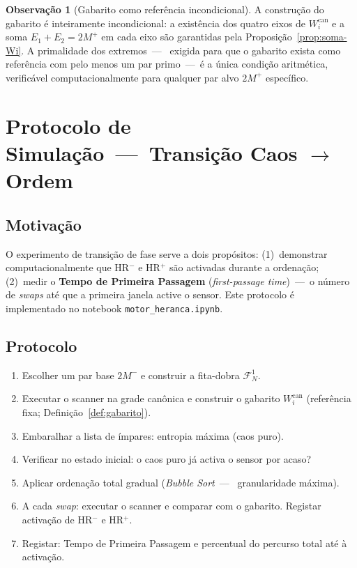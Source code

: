 \documentclass[12pt, a4paper]{article}
\theoremstyle{plain}
\theoremstyle{definition}
\newtheorem{remark}[theorem]{Observação}
\theoremstyle{remark}
\begin{document}
	\begin{remark}[Gabarito como referência incondicional]
		A construção do gabarito é inteiramente incondicional:
		a existência dos quatro eixos de $W_i^{\text{can}}$ e a soma
		$E_1+E_2=2M^+$ em cada eixo são garantidas pela
		Proposição~\ref{prop:soma-Wi}.  A primalidade dos extremos~---~
		exigida para que o gabarito exista como referência com pelo menos
		um par primo~---~é a única condição aritmética, verificável
		computacionalmente para qualquer par alvo $2M^+$ específico.
	\end{remark}
	
	\section{Protocolo de Simulação~---~Transição Caos $\to$ Ordem}
	\label{sec:simulacao}
	
	\subsection{Motivação}
	
	O experimento de transição de fase serve a dois propósitos:
	(1)~demonstrar computacionalmente que HR$^-$ e HR$^+$ são activadas
	durante a ordenação; (2)~medir o \textbf{Tempo de Primeira Passagem}
	(\emph{first-passage time})~---~o número de \emph{swaps} até que a
	primeira janela active o sensor.  Este protocolo é implementado no
	notebook \texttt{motor\_heranca.ipynb}.
	
	\subsection{Protocolo}
	
	\begin{enumerate}
		\item Escolher um par base $2M^-$ e construir a fita-dobra
		$\mathcal{F}_N^1$.
		\item Executar o scanner na grade canônica e construir o gabarito
		$W_i^{\text{can}}$ (referência fixa;
		Definição~\ref{def:gabarito}).
		\item Embaralhar a lista de ímpares: entropia máxima (caos puro).
		\item Verificar no estado inicial: o caos puro já activa o sensor
		por acaso?
		\item Aplicar ordenação total gradual (\emph{Bubble Sort}~---~
		granularidade máxima).
		\item A cada \emph{swap}: executar o scanner e comparar com o
		gabarito.  Registar activação de HR$^-$ e HR$^+$.
		\item Registar: Tempo de Primeira Passagem e percentual do
		percurso total até à activação.
	\end{enumerate}
	
\end{document}
